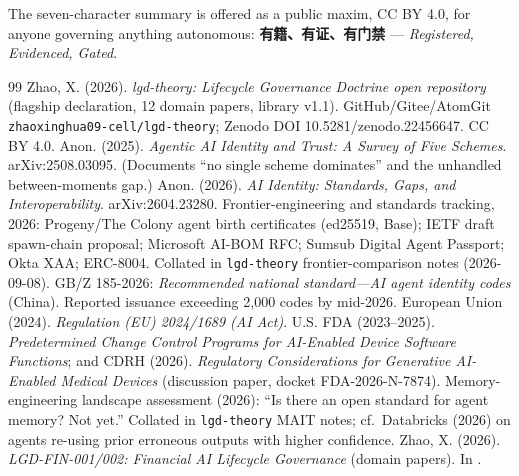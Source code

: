 \documentclass[12pt]{article}
\begin{document}
The seven-character summary is offered as a public maxim, CC BY 4.0, for anyone governing anything autonomous: \textbf{有籍、有证、有门禁} --- \emph{Registered, Evidenced, Gated}.

\begin{thebibliography}{99}\small
{} Zhao, X. (2026). \emph{lgd-theory: Lifecycle Governance Doctrine open repository} (flagship declaration, 12 domain papers, library v1.1). GitHub/Gitee/AtomGit \texttt{zhaoxinghua09-cell/lgd-theory}; Zenodo DOI 10.5281/zenodo.22456647. CC BY 4.0.
 Anon. (2025). \emph{Agentic AI Identity and Trust: A Survey of Five Schemes}. arXiv:2508.03095. (Documents ``no single scheme dominates'' and the unhandled between-moments gap.)
 Anon. (2026). \emph{AI Identity: Standards, Gaps, and Interoperability}. arXiv:2604.23280.
 Frontier-engineering and standards tracking, 2026: Progeny/The Colony agent birth certificates (ed25519, Base); IETF draft spawn-chain proposal; Microsoft AI-BOM RFC; Sumsub Digital Agent Passport; Okta XAA; ERC-8004. Collated in \texttt{lgd-theory} frontier-comparison notes (2026-09-08).
 GB/Z 185-2026: \emph{Recommended national standard---AI agent identity codes} (China). Reported issuance exceeding 2{,}000 codes by mid-2026.
 European Union (2024). \emph{Regulation (EU) 2024/1689 (AI Act)}.
 U.S. FDA (2023--2025). \emph{Predetermined Change Control Programs for AI-Enabled Device Software Functions}; and CDRH (2026). \emph{Regulatory Considerations for Generative AI-Enabled Medical Devices} (discussion paper, docket FDA-2026-N-7874).
 Memory-engineering landscape assessment (2026): ``Is there an open standard for agent memory? Not yet.'' Collated in \texttt{lgd-theory} MAIT notes; cf.\ Databricks (2026) on agents re-using prior erroneous outputs with higher confidence.
 Zhao, X. (2026). \emph{LGD-FIN-001/002: Financial AI Lifecycle Governance} (domain papers). In \cite{lgdrepo}.
\end{thebibliography}
\end{document}
